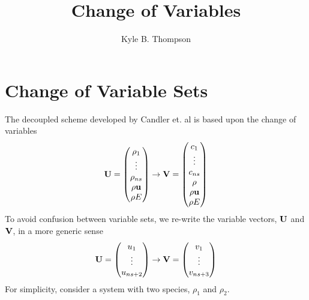 \documentclass[a4paper]{report}
\title{Change of Variables}
\author{Kyle B. Thompson}
\begin{document}
\maketitle

\section{Change of Variable Sets}
\label{change-of-var-section}

The decoupled scheme developed by Candler et. al is based upon the change of
variables
\begin{equation}
  \mathbf U = \begin{pmatrix}
    \rho_1 \\
    \vdots \\
    \rho_{ns} \\
    \rho \mathbf u \\
    \rho E
  \end{pmatrix}
  \rightarrow
  \mathbf V = \begin{pmatrix}
    c_1 \\
    \vdots \\
    c_{ns} \\
    \rho \\
    \rho \mathbf u \\
    \rho E
  \end{pmatrix}
  \label{var-sets}
\end{equation}
To avoid confusion between variable sets, we re-write the variable vectors,
$\mathbf U$ and $\mathbf V$, in a more generic sense
\begin{equation}
  \mathbf U = \begin{pmatrix}
    u_1 \\
    \vdots \\
    u_{ns + 2}
  \end{pmatrix}
  \rightarrow
  \mathbf V = \begin{pmatrix}
    v_1 \\
    \vdots \\
    v_{ns + 3}
  \end{pmatrix}
  \label{generic-var-sets}
\end{equation}
For simplicity, consider a system with two species, $\rho_1$ and $\rho_2$.
\end{document}
